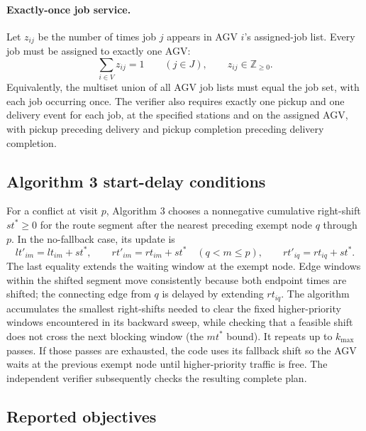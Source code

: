 \paragraph{Exactly-once job service.}
Let $z_{ij}$ be the number of times job $j$ appears in AGV $i$'s assigned-job
list. Every job must be assigned to exactly one AGV:
\[
  \sum_{i\in V}z_{ij}=1\qquad(j\in J),\qquad z_{ij}\in\mathbb{Z}_{\ge0}.
\]
Equivalently, the multiset union of all AGV job lists must equal the job set,
with each job occurring once. The verifier also requires exactly one pickup
and one delivery event for each job, at the specified stations and on the
assigned AGV, with pickup preceding delivery and pickup completion preceding
delivery completion.

\subsection{Algorithm 3 start-delay conditions}

For a conflict at visit $p$, Algorithm 3 chooses a nonnegative cumulative
right-shift $st^*\ge0$ for the route segment after the nearest preceding
exempt node $q$ through $p$. In the no-fallback case, its update is
\[
  lt'_{im}=lt_{im}+st^*,\qquad rt'_{im}=rt_{im}+st^*
  \quad(q<m\le p),\qquad
  rt'_{iq}=rt_{iq}+st^*.
\]
The last equality extends the waiting window at the exempt node. Edge windows
within the shifted segment move consistently because both endpoint times are
shifted; the connecting edge from $q$ is delayed by extending $rt_{iq}$. The
algorithm accumulates the smallest right-shifts needed to clear the fixed
higher-priority windows encountered in its backward sweep, while checking
that a feasible shift does not cross the next blocking window (the $mt^*$
bound). It repeats up to $k_{\max}$ passes. If those passes are exhausted,
the code uses its fallback shift so the AGV waits at the previous exempt node
until higher-priority traffic is free. The independent verifier subsequently
checks the resulting complete plan.

\subsection{Reported objectives}

